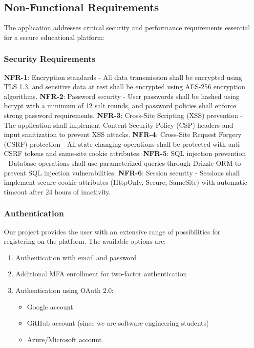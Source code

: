 \subsection{Non-Functional Requirements}

The application addresses critical security and performance requirements essential for a secure educational platform:

\subsubsection{Security Requirements}

     \textbf{NFR-1}: Encryption standards - All data transmission shall be encrypted using TLS 1.3, and sensitive data at rest shall be encrypted using AES-256 encryption algorithms.
     \textbf{NFR-2}: Password security - User passwords shall be hashed using bcrypt with a minimum of 12 salt rounds, and password policies shall enforce strong password requirements.
     \textbf{NFR-3}: Cross-Site Scripting (XSS) prevention - The application shall implement Content Security Policy (CSP) headers and input sanitization to prevent XSS attacks.
     \textbf{NFR-4}: Cross-Site Request Forgery (CSRF) protection - All state-changing operations shall be protected with anti-CSRF tokens and same-site cookie attributes.
     \textbf{NFR-5}: SQL injection prevention - Database operations shall use parameterized queries through Drizzle ORM \cite{drizzle} to prevent SQL injection vulnerabilities.
     \textbf{NFR-6}: Session security - Sessions shall implement secure cookie attributes (HttpOnly, Secure, SameSite) with automatic timeout after 24 hours of inactivity.

     \subsubsection*{Authentication}

Our project provides the user with an extensive range of possibilities for registering on the platform.
The available options are:

\begin{enumerate}
  \item Authentication with email and password
  \item Additional MFA enrollment for two-factor authentication
  \item Authentication using OAuth 2.0: \cite{google-oauth2}
    \begin{itemize}
      \item Google account
      \item GitHub account (since we are software engineering students)
      \item Azure/Microsoft account
    \end{itemize}
\end{enumerate}

